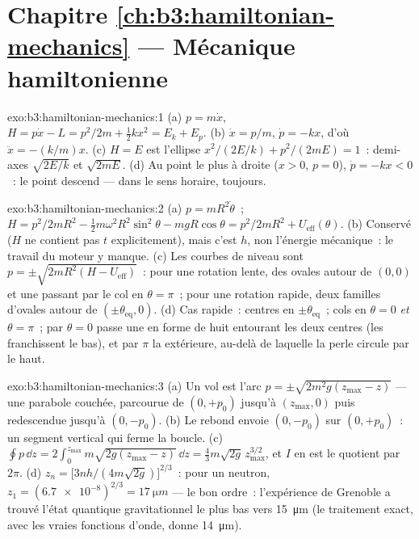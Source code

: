\section*{Chapitre \ref{ch:b3:hamiltonian-mechanics} --- Mécanique hamiltonienne}

\begin{solution}{exo:b3:hamiltonian-mechanics:1}
(a) $p = m\dot x$, $H = p\dot x - L = p^2/2m + \tfrac12 kx^2 = E_k +
E_p$. (b) $\dot x = p/m$, $\dot p = -kx$, d'où $\ddot x = -(k/m)x$.
(c) $H = E$ est l'ellipse $x^2/(2E/k) + p^2/(2mE) = 1$~: demi-axes
$\sqrt{2E/k}$ et $\sqrt{2mE}$. (d) Au point le plus à droite ($x > 0$,
$p = 0$), $\dot p = -kx < 0$~: le point descend --- dans le sens
horaire, toujours.
\end{solution}

\begin{solution}{exo:b3:hamiltonian-mechanics:2}
(a) $p = mR^2\dot\theta$~; $H = p^2/2mR^2 - \tfrac12 m\omega^2R^2
\sin^2\theta - mgR\cos\theta = p^2/2mR^2 + U_{\text{eff}}(\theta)$.
(b) Conservé ($H$ ne contient pas $t$ explicitement), mais c'est $h$,
non l'énergie mécanique~: le travail du moteur y manque. (c) Les
courbes de niveau sont $p = \pm\sqrt{2mR^2(H - U_{\text{eff}})}$~: pour
une rotation lente, des ovales autour de $(0, 0)$ et une  passant par le col en
$\theta = \pi$~; pour une rotation rapide, deux familles d'ovales
autour de $(\pm\theta_{\text{eq}}, 0)$. (d) Cas rapide~: centres en
$\pm\theta_{\text{eq}}$~; cols en $\theta = 0$ \emph{et} $\theta =
\pi$~; par $\theta = 0$ passe une  en forme de huit
entourant les deux centres (les  franchissent le
bas), et par $\pi$ la  extérieure, au-delà de laquelle la
perle circule par le haut.
\end{solution}

\begin{solution}{exo:b3:hamiltonian-mechanics:3}
(a) Un vol est l'arc $p = \pm\sqrt{2m^2g(z_{\max} - z)}$ --- une
parabole couchée, parcourue de $(0, +p_0)$ jusqu'à $(z_{\max}, 0)$
puis redescendue jusqu'à $(0, -p_0)$. (b) Le rebond envoie
$(0, -p_0)$ sur $(0, +p_0)$~: un segment vertical qui ferme la boucle. (c)
$\oint p\,\dd z = 2\int_0^{z_{\max}}m\sqrt{2g(z_{\max} - z)}\,\dd z =
\tfrac43 m\sqrt{2g}\,z_{\max}^{3/2}$, et $I$ en est le quotient par $2\pi$. (d)
$z_n = \big[3nh/(4m\sqrt{2g})\big]^{2/3}$~: pour un neutron, $z_1 =
(\num{6.7e-8})^{2/3} = \qty{17}{\micro m}$ --- le bon ordre~:
l'expérience de Grenoble a trouvé l'état quantique gravitationnel le
plus bas vers \qty{15}{\micro m} (le traitement exact, avec les vraies
fonctions d'onde, donne \qty{14}{\micro m}).
\end{solution}

